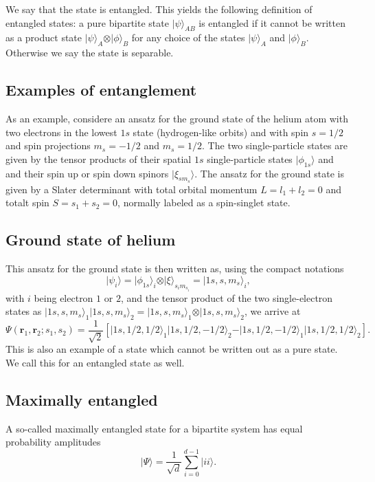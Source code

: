 We say that the state is entangled. This yields the following
definition of entangled states: a pure bipartite state $\vert
\psi\rangle_{AB}$ is entangled if it cannot be written as a product
state $\vert\psi\rangle_{A}\otimes\vert\phi\rangle_B$ for any choice
of the states $\vert\psi\rangle_{A}$ and $\vert\phi\rangle_B$. Otherwise we say the state is separable.

\subsection{Examples of entanglement}

As an example, considere an ansatz for the ground state of the helium
atom with two electrons in the lowest $1s$ state (hydrogen-like
orbits) and with spin $s=1/2$ and spin projections $m_s=-1/2$ and
$m_s=1/2$.  The two single-particle states are given by the tensor
products of their spatial $1s$ single-particle states
$\vert\phi_{1s}\rangle$ and and their spin up or spin down spinors
$\vert\xi_{sm_s}\rangle$. The ansatz for the ground state is given by a Slater
determinant with total orbital momentum $L=l_1+l_2=0$ and totalt spin
$S=s_1+s_2=0$, normally labeled as a spin-singlet state.

\subsection{Ground state of helium}
This ansatz
for the ground state is then written as, using the compact notations
\[
\vert \psi_{i}\rangle = \vert\phi_{1s}\rangle_i\otimes \vert \xi\rangle_{s_im_{s_i}}=\vert 1s,s,m_s\rangle_i,  \]
with $i$ being electron $1$ or $2$, and the tensor product of the two single-electron states as
$\vert 1s,s,m_s\rangle_1\vert 1s,s,m_s\rangle_2=\vert 1s,s,m_s\rangle_1\otimes \vert 1s,s,m_s\rangle_2$, we arrive at
\[
\Psi(\bm{r}_1,\bm{r}_2;s_1,s_2)=\frac{1}{\sqrt{2}}\left[\vert 1s,1/2,1/2\rangle_1\vert 1s,1/2,-1/2\rangle_2-\vert 1s,1/2,-1/2\rangle_1\vert 1s,1/2,1/2\rangle_2\right].
\]
This is also an example of a state which cannot be written out as a pure state. We call this for an entangled state as well.

\subsection{Maximally entangled}

A so-called maximally entangled state for a bipartite system has equal  probability amplitudes
\[
\vert \Psi \rangle = \frac{1}{\sqrt{d}}\sum_{i=0}^{d-1}\vert ii\rangle.
\]


